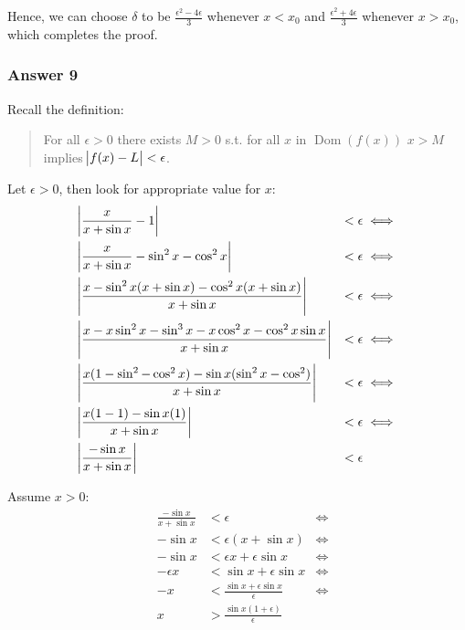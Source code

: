 \documentclass[11pt]{article}
\DeclareMathOperator{\Dom}{Dom}
\begin{document}
Hence, we can choose $\delta$ to be $\frac{\epsilon^2 - 4\epsilon}{3}$
whenever $x < x_0$ and $\frac{\epsilon^2 + 4\epsilon}{3}$ whenever
$x > x_0$, which completes the proof.
\subsubsection{Answer 9}
\label{sec-1-3-2}
Recall the definition:
\begin{quote}
For all $\epsilon > 0$ there exists $M > 0$ s.t. for all $x$ in
$\Dom(f(x))$ $x > M$ implies $\abs{f(x) - L} < \epsilon$.
\end{quote}

Let $\epsilon > 0$, then look for appropriate value for $x$:
\begin{equation*}
  \begin{aligned}
    &\abs{\frac{x}{x + \sin x} - 1}                   &< \epsilon &\iff \\
    &\abs{\frac{x}{x + \sin x} - \sin^2 x - \cos^2 x} &< \epsilon &\iff \\
    &\abs{\frac{x - \sin^2 x(x + \sin x) -
        \cos^2 x(x + \sin x)}{x + \sin x}}            &< \epsilon &\iff \\
    &\abs{\frac{x - x\sin^2 x - \sin^3 x -
        x\cos^2 x - \cos^2 x \sin x}{x + \sin x}}     &< \epsilon &\iff \\
    &\abs{\frac{x(1 - \sin^2 - \cos^2 x) -
        \sin x(\sin^2 x - \cos^2)}{x + \sin x}}       &< \epsilon &\iff \\
    &\abs{\frac{x(1 - 1) - \sin x(1)}{x + \sin x}}    &< \epsilon &\iff \\
    &\abs{\frac{-\sin x}{x + \sin x}}                 &< \epsilon \\
  \end{aligned}
\end{equation*}

Assume $x > 0$:
\begin{equation*}
  \begin{aligned}
    &\frac{-\sin x}{x + \sin x} &< \epsilon &\iff \\
    &-\sin x                    &< \epsilon(x + \sin x) &\iff \\
    &-\sin x                    &< \epsilon x + \epsilon \sin x &\iff \\
    &-\epsilon x                &< \sin x + \epsilon \sin x &\iff \\
    &-x                         &< \frac{\sin x + \epsilon \sin x}{\epsilon} &\iff \\
    &x                          &> \frac{\sin x(1 + \epsilon)}{\epsilon}
  \end{aligned}
\end{equation*}
\end{document}
